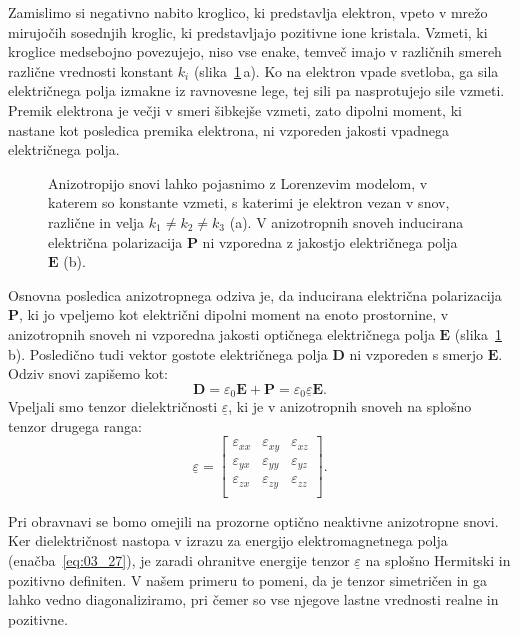 Zamislimo si negativno nabito kroglico, ki predstavlja elektron, vpeto v 
mrežo mirujočih so\-sed\-njih kroglic, ki predstavljajo pozitivne ione kristala. 
Vzmeti, ki kroglice medsebojno povezujejo, niso vse enake, temveč imajo 
v različnih smereh različne vrednosti konstant $k_i$ (slika~\ref{fig:10_model}\,a). Ko na elektron
vpade svetloba, ga sila električnega polja izmakne iz ravnovesne lege, tej sili 
pa nasprotujejo sile vzmeti. Premik elektrona je večji v smeri šibkejše vzmeti, 
zato dipolni moment, ki nastane kot posledica premika elektrona, ni vzporeden jakosti 
vpadnega električnega
polja. 
\begin{figure}[ht]
\centering
\def\svgwidth{120truemm} 

\caption{Anizotropijo snovi lahko pojasnimo z Lorenzevim modelom, v katerem so
konstante vzmeti, s katerimi je elektron vezan v snov, različne  in velja $k_1 \neq k_2 \neq k_3$ (a).
V anizotropnih snoveh inducirana električna polarizacija $\mathbf{P}$ ni vzporedna 
z jakostjo električnega polja $\mathbf{E}$ (b).}
\label{fig:10_model}
\end{figure}

Osnovna posledica anizotropnega odziva je, da inducirana električna polarizacija $\mathbf{P}$, 
ki jo vpeljemo kot električni dipolni moment na enoto prostornine,
 v anizotropnih snoveh ni vzporedna jakosti optičnega električnega polja $\mathbf{E}$ 
(slika~\ref{fig:10_model}\,b). Posledično tudi 
vektor gostote električnega polja $\mathbf{D}$ ni vzporeden s smerjo $\mathbf{E}$. 
Odziv snovi zapišemo kot:
\begin{equation}
\mathbf{D} = \varepsilon_0 \mathbf{E} + \mathbf{P} = \varepsilon_0 \underline{\varepsilon} \mathbf{E}.
\label{eq:10_001}
\end{equation}
Vpeljali smo tenzor dielektričnosti $\underline{\varepsilon}$, ki je v anizotropnih snoveh na splošno 
tenzor drugega ranga:
\begin{equation}
\underline{\varepsilon} = 
\left[\begin{array}{ccc}
\varepsilon_{xx} & \varepsilon_{xy} & \varepsilon_{xz}\\
\varepsilon_{yx} & \varepsilon_{yy} & \varepsilon_{yz}\\
\varepsilon_{zx} & \varepsilon_{zy} & \varepsilon_{zz}\\
\end{array}\right]\!\!.
\label{eq:10_002}
\end{equation}
\begin{remark}
Pri obravnavi se bomo omejili na prozorne optično neaktivne anizotropne snovi. 
Ker dielektričnost nastopa v izrazu za energijo elektromagnetnega polja 
(enačba~\ref{eq:03_27}), je zaradi ohranitve energije tenzor $\underline{\varepsilon}$ na splošno
Hermitski in pozitivno definiten. V našem primeru to pomeni, da je 
tenzor simetričen in ga lahko vedno diagonaliziramo, pri čemer so 
vse njegove lastne vrednosti realne in pozitivne.
\end{remark}

